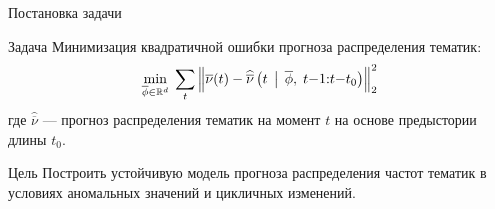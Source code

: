 \documentclass{beamer}
\begin{document}
\begin{frame}{Постановка задачи}
  \vspace{-0.3cm}
  \begin{block}{Задача}
    Минимизация квадратичной ошибки прогноза распределения тематик: 
       \footnotesize
    \[
    \min_{\overline{\phi} \in \mathbb{R}^d} \; 
    \sum_{t} 
    \left\|
    \overline{\nu}(t)
    -
    \widehat{\overline{\nu}}\left(t \,\bigm|\, \overline{\phi},\; t{-}1{:}t{-}t_0 \right)
    \right\|_2^2
    \]
        \normalsize
    где $\widehat{\overline{\nu}}$ --- прогноз распределения тематик на момент $t$ на основе предыстории длины $t_0$.

  \end{block}

  \begin{block}{Цель}
    Построить устойчивую модель прогноза распределения частот тематик в условиях аномальных значений и цикличных изменений.
  \end{block}
\end{frame}
\end{document}
